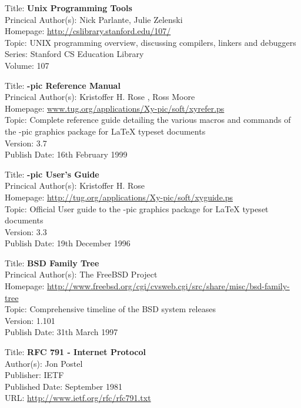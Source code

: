 
Title: 	\textbf{Unix Programming Tools}	\\
Princical Author(s): 	Nick Parlante, Julie Zelenski \\
Homepage: 	\url{http://cslibrary.stanford.edu/107/}	\\	
Topic:		UNIX programming overview, discussing compilers, linkers and debuggers \\
Series:		Stanford CS Education Library	\\
Volume:		107 


Title: 	\textbf{\textrm{\Xy-pic} Reference Manual}	\\
Princical Author(s): 	Kristoffer H. Rose , Ross Moore \\
Homepage:	\url{www.tug.org/applications/Xy-pic/soft/xyrefer.ps} 	\\	
Topic:		Complete reference guide detailing the various macros and commands of the \textrm{\Xy-pic} graphics package for \textrm{\LaTeX{}} typeset documents \\
Version:		3.7 \\
Publish Date:		16th February 1999


Title: 	\textbf{\textrm{\Xy-pic} User's Guide}	\\
Princical Author(s): 	Kristoffer H. Rose  \\
Homepage:	\url{http://tug.org/applications/Xy-pic/soft/xyguide.ps} 	\\	
Topic:		Official User guide to the \textrm{\Xy-pic} graphics package for \textrm{\LaTeX{}} typeset documents \\
Version:		3.3 \\
Publish Date:		19th December 1996


Title: 	\textbf{BSD Family Tree}	\\
Princical Author(s): 	The FreeBSD Project \\
Homepage:
\url{http://www.freebsd.org/cgi/cvsweb.cgi/src/share/misc/bsd-family-tree} 	\\	
Topic:		Comprehensive timeline of the BSD system releases\\
Version:		1.101 \\
Publish Date:		31th March 1997


Title: \textbf{RFC 791 - Internet Protocol} \\
Author(s): Jon Postel \\
Publisher: IETF \\ 
Published Date: September 1981 \\ 
URL: \url{http://www.ietf.org/rfc/rfc791.txt}    


